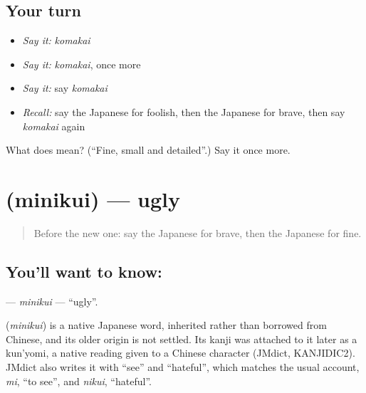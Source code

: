 \subsection*{Your turn}
\begin{itemize}
\raggedright
  \item \emph{Say it:} \emph{komakai}
  \item \emph{Say it:} \emph{komakai}, once more
  \item \emph{Say it:} say \emph{komakai}
  \item \emph{Recall:} say the Japanese for foolish, then the Japanese for brave, then say \emph{komakai} again
\end{itemize}

\begin{tcolorbox}[breakable,colback=teal!4,colframe=teal!35!black,title={Before you move on}]
What does  mean? (\textquotedblleft{}Fine, small and detailed\textquotedblright{}.) Say it once more.
\end{tcolorbox}
\section[\texorpdfstring{\ja{みにくい} (minikui)}{みにくい (minikui)}]{ (minikui) — ugly}

\label{lesson:JA-C128-minikui}



\begin{quote}
Before the new one: say the Japanese for brave, then the Japanese for fine.
\end{quote}

\subsection*{You'll want to know: }
\textbf{} — \emph{minikui} — \textquotedblleft{}ugly\textquotedblright{}.

\begin{cousinweb}
\textbf{} (\emph{minikui}) is a native Japanese word, inherited rather than borrowed from Chinese, and its older origin is not settled. Its kanji was attached to it later as a kun'yomi, a native reading given to a Chinese character (JMdict, KANJIDIC2). JMdict also writes it with \textquotedblleft{}see\textquotedblright{} and \textquotedblleft{}hateful\textquotedblright{}, which matches the usual account, \emph{mi}, \textquotedblleft{}to see\textquotedblright{}, and \emph{nikui}, \textquotedblleft{}hateful\textquotedblright{}.
\end{cousinweb}

